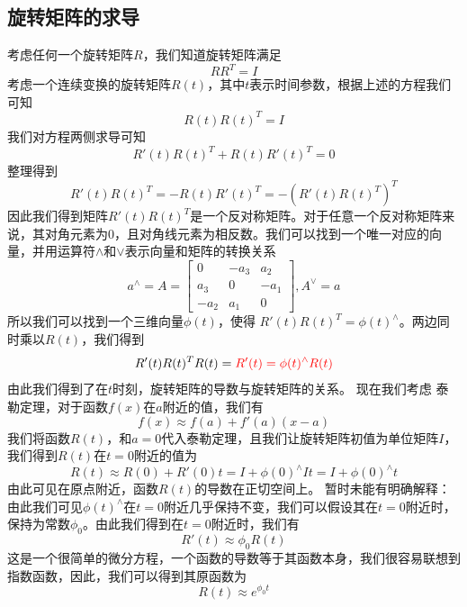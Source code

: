 \subsection{旋转矩阵的求导}
考虑任何一个旋转矩阵\(R\)，我们知道旋转矩阵满足
\[
    RR^T = I
\]
考虑一个连续变换的旋转矩阵\(R(t)\)，其中\(t\)表示时间参数，根据上述的方程我们可知
\[
    R(t)R(t)^T = I
\]
我们对方程两侧求导可知
\[
    R'(t)R(t)^T + R(t)R'(t)^T=0
\]
整理得到
\[
    R'(t)R(t)^T = -R(t)R'(t)^T = -(R'(t)R(t)^T)^T
\]
因此我们得到矩阵\(R'(t)R(t)^T\)是一个反对称矩阵。对于任意一个反对称矩阵来说，其对角元素为\(0\)，且对角线元素为相反数。我们可以找到一个唯一对应的向量，并用运算符\(\wedge\)和\(\vee\)表示向量和矩阵的转换关系
\[
    a^\wedge = A = \begin{bmatrix}0 & -a_3 & a_2\\a_3 & 0 & -a_1\\-a_2 & a_1 & 0\end{bmatrix}, A^\vee = a
\]
所以我们可以找到一个三维向量\(\phi(t)\)，使得{\color{red} \(R'(t)R(t)^T=\phi(t)^\wedge\)}。两边同时乘以\(R(t)\)，我们得到
\[
    R'(t)R(t)^TR(t) = {\color{red} R'(t) = \phi(t)^\wedge R(t)}
\]
由此我们得到了在\(t\)时刻，旋转矩阵的导数与旋转矩阵的关系。
现在我们考虑{\color{blue} 泰勒定理}，对于函数\(f(x)\)在\(a\)附近的值，我们有
\[
    f(x) \approx f(a) + f'(a)(x-a)
\]
我们将函数\(R(t)\)，和\(a=0\)代入泰勒定理，且我们让旋转矩阵初值为单位矩阵\(I\)，我们得到\(R(t)\)在\(t=0\)附近的值为
\[
    R(t) \approx R(0) + R'(0)t = I + \phi(0)^\wedge I t = I + \phi(0)^\wedge t
\]
由此可见在原点附近，函数\(R(t)\)的导数在正切空间上。
{\color{red} 暂时未能有明确解释：由此我们可见\(\phi(t)^\wedge\)在\(t=0\)附近几乎保持不变，我们可以假设其在\(t=0\)附近时，保持为常数\(\phi_0\)。由此我们得到在\(t=0\)附近时，我们有}
\[
    R'(t) \approx \phi_0 R(t)
\]
这是一个很简单的微分方程，一个函数的导数等于其函数本身，我们很容易联想到指数函数，因此，我们可以得到其原函数为
\[
    R(t) \approx e^{\phi_0 t}
\]


